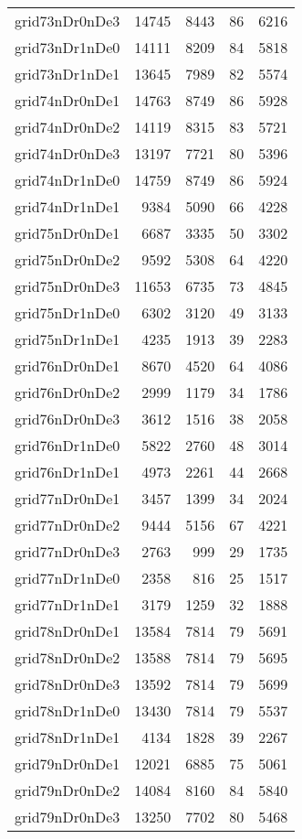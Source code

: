 \begin{longtable}{lrrrr}
grid73nDr0nDe3 & 14745 & 8443 & 86 & 6216 \\
grid73nDr1nDe0 & 14111 & 8209 & 84 & 5818 \\
grid73nDr1nDe1 & 13645 & 7989 & 82 & 5574 \\
grid74nDr0nDe1 & 14763 & 8749 & 86 & 5928 \\
grid74nDr0nDe2 & 14119 & 8315 & 83 & 5721 \\
grid74nDr0nDe3 & 13197 & 7721 & 80 & 5396 \\
grid74nDr1nDe0 & 14759 & 8749 & 86 & 5924 \\
grid74nDr1nDe1 & 9384 & 5090 & 66 & 4228 \\
grid75nDr0nDe1 & 6687 & 3335 & 50 & 3302 \\
grid75nDr0nDe2 & 9592 & 5308 & 64 & 4220 \\
grid75nDr0nDe3 & 11653 & 6735 & 73 & 4845 \\
grid75nDr1nDe0 & 6302 & 3120 & 49 & 3133 \\
grid75nDr1nDe1 & 4235 & 1913 & 39 & 2283 \\
grid76nDr0nDe1 & 8670 & 4520 & 64 & 4086 \\
grid76nDr0nDe2 & 2999 & 1179 & 34 & 1786 \\
grid76nDr0nDe3 & 3612 & 1516 & 38 & 2058 \\
grid76nDr1nDe0 & 5822 & 2760 & 48 & 3014 \\
grid76nDr1nDe1 & 4973 & 2261 & 44 & 2668 \\
grid77nDr0nDe1 & 3457 & 1399 & 34 & 2024 \\
grid77nDr0nDe2 & 9444 & 5156 & 67 & 4221 \\
grid77nDr0nDe3 & 2763 & 999 & 29 & 1735 \\
grid77nDr1nDe0 & 2358 & 816 & 25 & 1517 \\
grid77nDr1nDe1 & 3179 & 1259 & 32 & 1888 \\
grid78nDr0nDe1 & 13584 & 7814 & 79 & 5691 \\
grid78nDr0nDe2 & 13588 & 7814 & 79 & 5695 \\
grid78nDr0nDe3 & 13592 & 7814 & 79 & 5699 \\
grid78nDr1nDe0 & 13430 & 7814 & 79 & 5537 \\
grid78nDr1nDe1 & 4134 & 1828 & 39 & 2267 \\
grid79nDr0nDe1 & 12021 & 6885 & 75 & 5061 \\
grid79nDr0nDe2 & 14084 & 8160 & 84 & 5840 \\
grid79nDr0nDe3 & 13250 & 7702 & 80 & 5468 \\

\end{longtable}
